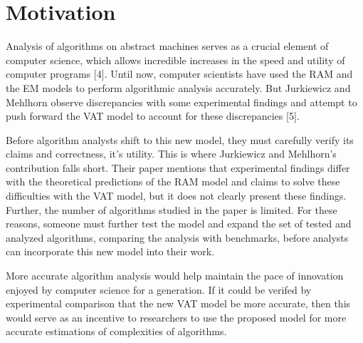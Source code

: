 \section{Motivation}

Analysis of algorithms on abstract machines serves as a crucial element of
computer science, which allows incredible increases in the speed and utility
of computer programs [4]. Until now, computer scientists have used the RAM and
the EM models to perform algorithmic analysis accurately. But Jurkiewicz and
Mehlhorn observe discrepancies with some experimental findings and attempt to
push forward the VAT model to account for these discrepancies [5]. 

Before algorithm analysts shift to this new model, they must carefully verify
its claims and correctness, it's utility. This is where Jurkiewicz and
Mehlhorn's contribution falls short. Their paper mentions that experimental
findings differ with the theoretical predictions of the RAM model and claims
to solve these difficulties with the VAT model, but it does not clearly
present these findings. Further, the number of algorithms studied in the paper
is limited. For these reasons, someone must further test the model and expand
the set of tested and analyzed algorithms, comparing the analysis with
benchmarks, before analysts can incorporate this new model into their work.

More accurate algorithm analysis would help maintain the pace of innovation
enjoyed by computer science for a generation. If it could be verifed by
experimental comparison that the new VAT model be more accurate, then this
would serve as an incentive to researchers to use the proposed model for more
accurate estimations of complexities of algorithms.